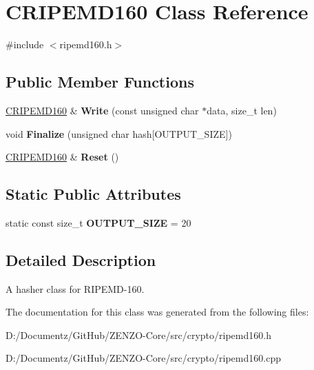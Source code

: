 \hypertarget{class_c_r_i_p_e_m_d160}{}\section{C\+R\+I\+P\+E\+M\+D160 Class Reference}
\label{class_c_r_i_p_e_m_d160}


{\ttfamily \#include $<$ripemd160.\+h$>$}

\subsection*{Public Member Functions}
\begin{DoxyCompactItemize}
\item 
\mbox{\label{class_c_r_i_p_e_m_d160_a221143b9d94af623d07c4f4ba1bf6007}} 
\mbox{\hyperlink{class_c_r_i_p_e_m_d160}{C\+R\+I\+P\+E\+M\+D160}} \& {\bfseries Write} (const unsigned char $\ast$data, size\+\_\+t len)
\item 
\mbox{\label{class_c_r_i_p_e_m_d160_a2a11566fbf9d1339b819833313fc4e51}} 
void {\bfseries Finalize} (unsigned char hash\mbox{[}O\+U\+T\+P\+U\+T\+\_\+\+S\+I\+ZE\mbox{]})
\item 
\mbox{\label{class_c_r_i_p_e_m_d160_ac096d8ee1b21500f1b6173c44896107b}} 
\mbox{\hyperlink{class_c_r_i_p_e_m_d160}{C\+R\+I\+P\+E\+M\+D160}} \& {\bfseries Reset} ()
\end{DoxyCompactItemize}
\subsection*{Static Public Attributes}
\begin{DoxyCompactItemize}
\item 
\mbox{\label{class_c_r_i_p_e_m_d160_aa43ca990046f81de5473975e5ef71922}} 
static const size\+\_\+t {\bfseries O\+U\+T\+P\+U\+T\+\_\+\+S\+I\+ZE} = 20
\end{DoxyCompactItemize}


\subsection{Detailed Description}
A hasher class for R\+I\+P\+E\+M\+D-\/160. 

The documentation for this class was generated from the following files\+:\begin{DoxyCompactItemize}
\item 
D\+:/\+Documentz/\+Git\+Hub/\+Z\+E\+N\+Z\+O-\/\+Core/src/crypto/ripemd160.\+h\item 
D\+:/\+Documentz/\+Git\+Hub/\+Z\+E\+N\+Z\+O-\/\+Core/src/crypto/ripemd160.\+cpp\end{DoxyCompactItemize}
